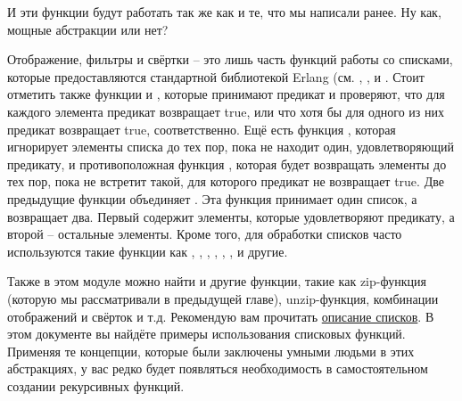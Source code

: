 И эти функции будут работать так же как и те, что мы написали ранее.
Ну как, мощные абстракции или нет?

Отображение, фильтры и свёртки \--- это лишь часть функций работы со списками, которые предоставляются стандартной библиотекой Erlang (см. , ,  и .
Стоит отметить также функции  и , которые принимают предикат и проверяют, что для каждого элемента предикат возвращает true, или что хотя бы для одного из них предикат возвращает true, соответственно.
Ещё есть функция , которая игнорирует элементы списка до тех пор, пока не находит один, удовлетворяющий предикату, и противоположная функция , которая будет возвращать элементы до тех пор, пока не встретит такой, для которого предикат не возвращает true.
Две предыдущие функции объединяет .
Эта функция принимает один список, а возвращает два.
Первый содержит элементы, которые удовлетворяют предикату, а второй \--- остальные элементы. Кроме того, для обработки списков часто используются такие функции как , , , , , ,  и другие.

Также в этом модуле можно найти и другие функции, такие как zip\--функция (которую мы рассматривали в предыдущей главе), unzip\--функция, комбинации отображений и свёрток и т.д.
Рекомендую вам прочитать \href{http://erldocs.com/R15B/stdlib/lists.html}{описание списков}.
В этом документе вы найдёте примеры использования списковых функций.
Применяя те концепции, которые были заключены умными людьми в этих абстракциях, у вас редко будет появляться необходимость в самостоятельном создании рекурсивных функций.
